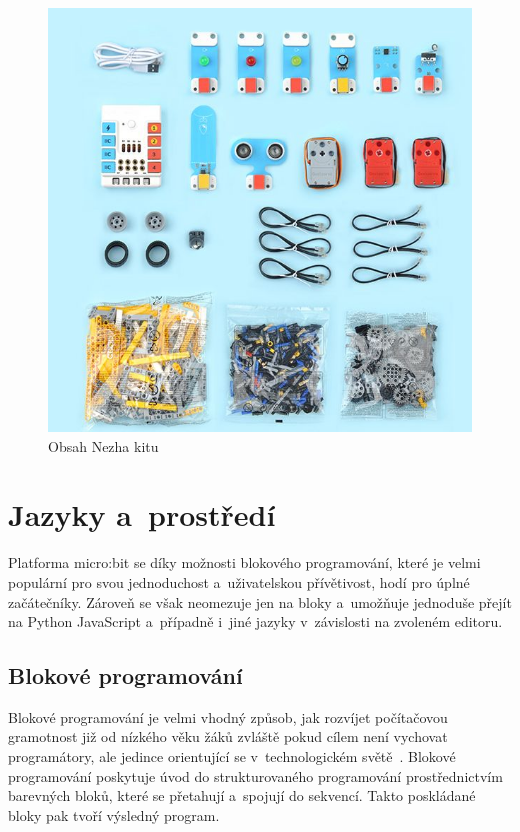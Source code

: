 \documentclass[
  digital,     %
  oneside,     %
  nosansbold,  %
  colorbold, %
  lof,         %
  nolot,         %
]{fithesis4}
\begin{document}
\begin{figure}
    \centering
    \includegraphics[width=\textwidth] {images/nezhaKit.jpg}
    \caption{Obsah Nezha kitu \cite{nezhasSet}}
    \label{nezhakit}
\end{figure}


\section{Jazyky a~prostředí}
Platforma micro:bit se díky možnosti blokového programování, které je velmi populární pro svou jednoduchost a~uživatelskou přívětivost, hodí pro úplné začátečníky. Zároveň se však neomezuje jen na bloky a~umožňuje jednoduše přejít na Python JavaScript a~případně i~jiné jazyky v~závislosti na zvoleném editoru. 

\subsection{Blokové programování}
Blokové programování je velmi vhodný způsob, jak rozvíjet počítačovou gramotnost již od nízkého věku žáků zvláště pokud cílem není vychovat programátory, ale jedince orientující se v~technologickém světě~\cite{Weintrop19}. Blokové programování poskytuje úvod do strukturovaného programování prostřednictvím barevných bloků, které se přetahují a~spojují do sekvencí. Takto poskládané bloky pak tvoří výsledný program.
\end{document}
